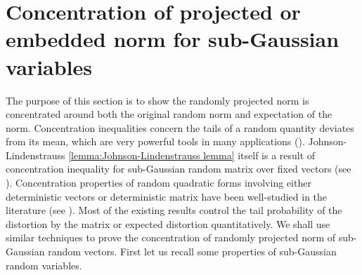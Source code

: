 \documentclass[12pt]{extarticle}
\newcommand{\1}{\field{1}}
\numberwithin{equation}{section}
\begin{document}

\section{Concentration of projected or embedded norm for sub-Gaussian variables}\label{sec:concen norm by JL}
 
The purpose of this section is to show the randomly projected norm is concentrated around both the original random norm and expectation of the norm. Concentration inequalities concern the tails of a random quantity deviates from its mean, which are very powerful tools in many applications (\cite{ledoux2001concentration, boucheron2013concentration, vershynin2018high}). Johnson-Lindenstrauss  \cref{lemma:Johnson-Lindenstrauss lemma} itself is a result of concentration inequality for sub-Gaussian random matrix over fixed vectors (see \cite{boucheron2013concentration, vershynin2018high}). Concentration properties of random quadratic forms involving either deterministic vectors or deterministic matrix have been well-studied in the literature (see \cite{tao2011topics, rudelson2013hanson, tropp2015introduction, vershynin2018high}). Most of the existing results control the tail probability of the distortion by the matrix or expected distortion quantitatively. We shall use similar techniques to prove the concentration of randomly projected norm of sub-Gaussian random vectors.  First let us recall some properties of sub-Gaussian  random variables.
\end{document}
